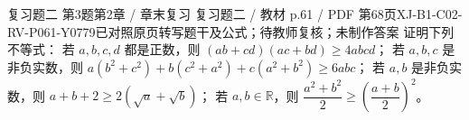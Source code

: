 \par\noindent\begin{minipage}{\linewidth}
\begin{bankitem}{复习题二 第3题}{第2章 / 章末复习 复习题二 / 教材 p.61 / PDF 第68页}{XJ-B1-C02-RV-P061-Y0779}{已对照原页转写题干及公式；待教师复核；未制作答案}
证明下列不等式：
若 $a,b,c,d$ 都是正数，则 $(ab+cd)(ac+bd)\ge4abcd$；
若 $a,b,c$ 是非负实数，则 $a(b^2+c^2)+b(c^2+a^2)+c(a^2+b^2)\ge6abc$；
若 $a,b$ 是非负实数，则 $a+b+2\ge2(\sqrt a+\sqrt b)$；
若 $a,b\in\mathbb R$，则 $\dfrac{a^2+b^2}2\ge\left(\dfrac{a+b}2\right)^2$。
\end{bankitem}
\end{minipage}\par\medskip
